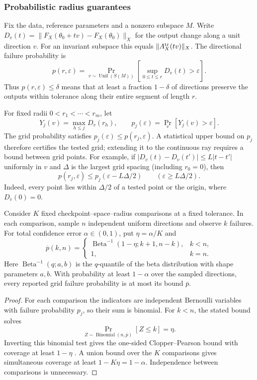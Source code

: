 \subsubsection{Probabilistic radius guarantees}
\label{app:radius-confidence}
Fix the data, reference parameters and a nonzero subspace $M$. Write
$D_v(t)=\|F_X(\theta_0+tv)-F_X(\theta_0)\|_X$ for the output change along a unit direction $v$. For an invariant subspace this equals $\|A_X^{\rm tr}(tv)\|_X$. The directional failure probability is
\[
 p(r,\varepsilon)=\Pr_{v\sim\operatorname{Unif}(S(M))}
 \left[\sup_{0\le t\le r}D_v(t)>\varepsilon\right].
\]
Thus $p(r,\varepsilon)\le\delta$ means that at least a fraction $1-\delta$ of directions preserve the outputs within tolerance along their entire segment of length $r$.

For fixed radii $0<r_1<\cdots<r_m$, let
\[
 Y_j(v)=\max_{h\le j}D_v(r_h),\qquad
 p_j(\varepsilon)=\Pr_v[Y_j(v)>\varepsilon].
\]
The grid probability satisfies $p_j(\varepsilon)\le p(r_j,\varepsilon)$. A statistical upper bound on $p_j$ therefore certifies the tested grid; extending it to the continuous ray requires a bound between grid points. For example, if $|D_v(t)-D_v(t')|\le L|t-t'|$ uniformly in $v$ and $\Delta$ is the largest grid spacing (including $r_0=0$), then
\[
 p(r_j,\varepsilon)\le p_j(\varepsilon-L\Delta/2)
 \qquad (\varepsilon\ge L\Delta/2).
\]
Indeed, every point lies within $\Delta/2$ of a tested point or the origin, where $D_v(0)=0$.

\begin{proposition}
\label{prop:probabilistic-radius}
Consider $K$ fixed checkpoint--space--radius comparisons at a fixed tolerance. In each comparison, sample $n$ independent uniform directions and observe $k$ failures. For total confidence error $\alpha\in(0,1)$, put $\eta=\alpha/K$ and
\[
 \overline p(k,n)=
 \begin{cases}
 \operatorname{Beta}^{-1}(1-\eta;k+1,n-k),&k<n,\\
 1,&k=n.
 \end{cases}
\]
Here $\operatorname{Beta}^{-1}(q;a,b)$ is the $q$-quantile of the beta distribution with shape parameters $a,b$. With probability at least $1-\alpha$ over the sampled directions, every reported grid failure probability is at most its bound $\overline p$.
\end{proposition}
\begin{proof}
For each comparison the indicators are independent Bernoulli variables with failure probability $p_j$, so their sum is binomial. For $k<n$, the stated bound solves
\[
 \Pr_{Z\sim\operatorname{Binomial}(n,\overline p)}[Z\le k]=\eta.
\]
Inverting this binomial test gives the one-sided Clopper--Pearson bound with coverage at least $1-\eta$ \citep{clopper1934confidence}. A union bound over the $K$ comparisons gives simultaneous coverage at least $1-K\eta=1-\alpha$. Independence between comparisons is unnecessary.
\end{proof}

